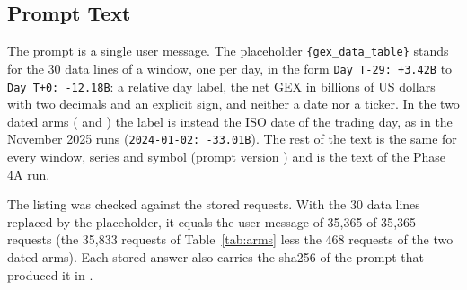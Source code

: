 \subsection{Prompt Text}
\label{app:prompt:body}

The prompt is a single user message. The placeholder \texttt{\{gex\_data\_table\}} stands for the 30 data lines of a window, one per day, in the form \texttt{Day T-29: +3.42B} to \texttt{Day T+0: -12.18B}: a relative day label, the net GEX in billions of US dollars with two decimals and an explicit sign, and neither a date nor a ticker. In the two dated arms ( and ) the label is instead the ISO date of the trading day, as in the November 2025 runs (\texttt{2024-01-02: -33.01B}). The rest of the text is the same for every window, series and symbol (prompt version ) and is the text of the Phase 4A run.

The listing was checked against the stored requests. With the 30 data lines replaced by the placeholder, it equals the user message of 35{,}365 of 35{,}365 requests (the 35{,}833 requests of Table~\ref{tab:arms} less the 468 requests of the two dated arms). Each stored answer also carries the sha256 of the prompt that produced it in .

